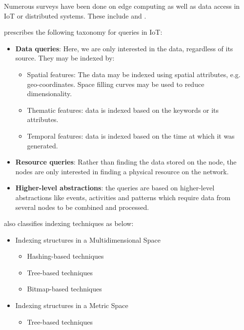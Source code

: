 Numerous surveys have been done on edge computing as well as data access in IoT
or distributed systems. These include \citet{kouahlaSurveyBigIoT2022} and
\citet{fathyLargeScaleIndexingDiscovery2018}.

\citet{fathyLargeScaleIndexingDiscovery2018} prescribes the following taxonomy
for queries in IoT:

\begin{itemize}
      \item \textbf{Data queries}: Here, we are only interested in the data,
            regardless of its source. They may be indexed by:
            \begin{itemize}
                  \item Spatial features: The data may be indexed using spatial
                        attributes, e.g. geo-coordinates. Space filling curves
                        may be used to reduce dimensionality.
                  \item Thematic features: data is indexed based on the keywords
                        or its attributes.
                  \item Temporal features: data is indexed based on the time at
                        which it was generated.
            \end{itemize}

      \item \textbf{Resource queries}: Rather than finding the data stored on
            the node, the nodes are only interested in finding a physical
            resource on the network.
      \item \textbf{Higher-level abstractions}: the queries are based on
            higher-level abstractions like events, activities and patterns which
            require data from several nodes to be combined and processed.
\end{itemize}

\citet{kouahlaSurveyBigIoT2022} also classifies indexing techniques as below:

\begin{itemize}
      \item Indexing structures in a Multidimensional Space
            \begin{itemize}
                  \item Hashing-based techniques
                  \item Tree-based techniques
                  \item Bitmap-based techniques
            \end{itemize}
      \item Indexing structures in a Metric Space
            \begin{itemize}
                  \item Tree-based techniques
            \end{itemize}
\end{itemize}

